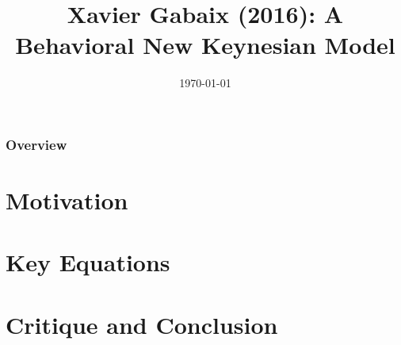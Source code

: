 \documentclass{beamer}
\title[A Behavioral New Keynesian Model]{Xavier Gabaix (2016): A Behavioral New Keynesian Model} %
\author{} %
\institute[] %
{
\\Carlos Montoya, Patrick Molligo and Clemens Stiewe %
\medskip
\textit{} %
}
\date{\today} %
\begin{document}
\begin{frame}
\titlepage %
\end{frame}

\begin{frame}
\frametitle{Overview} %
\tableofcontents %
\end{frame}


\section{Motivation} %
\section{Key Equations}
\section{Critique and Conclusion}


\end{document}
